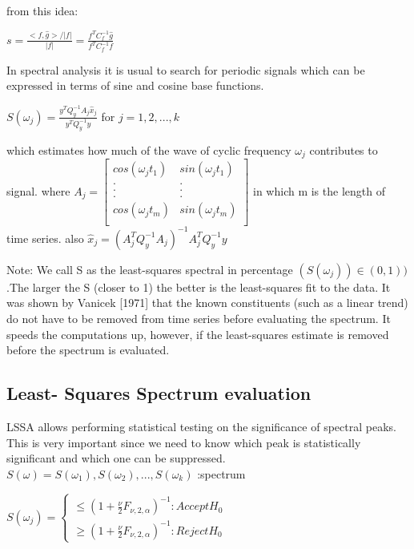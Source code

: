 \documentclass[12pt]{article}
\begin{document}
from this idea:
\begin{center}
$s = \frac{<f,\hat{g}>/|f|}{|f|} = \frac{f^T C_f^{-1} \hat{g}}{f^T C_f^{-1} f}$
\end{center}
In spectral analysis it is usual to search for periodic signals which can be expressed in
terms of sine and cosine base functions.
\begin{center}
$S(\omega_j) = \frac{y^T Q_y^{-1} A_j \hat{x}_j}{y^T Q_y^{-1} y}$ for $j = 1,2,...,k$
\end{center}
which estimates how much of the wave of cyclic frequency $\omega_j$ contributes to signal.
where $A_j = \begin{bmatrix}
cos(\omega_j t_1) & sin(\omega_j t_1) \\
. & . \\
. & . \\
. & . \\
cos(\omega_j t_m) & sin(\omega_j t_m) \\
\end{bmatrix}
$ in which m is the length of time series. also $\hat{x}_j = (A_j^T Q_y^{-1} A_j)^{-1} A_j^T Q_y^{-1} y$

Note: We call S as the least-squares spectral in percentage $(S(\omega_j)) \in 
(0,1))$.The larger the S (closer to 1) the better is the least-squares fit to the data.
It was shown by Vanicek [1971] that the known constituents (such
as a linear trend) do not have to be removed from time series
before evaluating the spectrum. It speeds the computations up, however, if the least-squares
estimate is removed before the spectrum is evaluated.


\subsection{Least- Squares Spectrum evaluation}
LSSA allows performing statistical testing on the significance of spectral
peaks. This is very important since we need to know which peak is statistically
significant and which one can be suppressed. \\ 
$S(\omega) = {S(\omega_1),S(\omega_2), ...,S(\omega_k)}$ :spectrum 
\begin{center}
$S(\omega_j) =  \begin{cases} 
\leq (1 + \frac{\nu}{2}F_{\nu,2,\alpha})^{-1} : Accept H_0\\
\geq (1 + \frac{\nu}{2}F_{\nu,2,\alpha})^{-1}
: Reject H_0
\end{cases}$
\end{center}
\newpage
\end{document}
